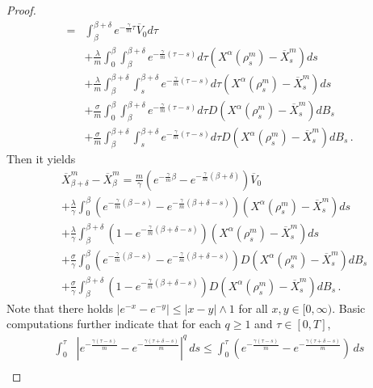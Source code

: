 \documentclass{ims9x6}
\newcommand{\nn}{\nonumber}
\newcommand{\OV}{\overline{V}}
\newcommand{\OX}{\overline{X}}
\begin{document}
\begin{proof}
\begin{equation*}
	\end{equation*}
	\begin{equation*}
		\begin{split}
		=&\int_\beta^{\beta+\delta}  e^{-\frac{\gamma}{m}\tau}\OV_0d\tau\\
		&+\frac{\lambda}{m}\int_0^\beta\int_\beta^{\beta+\delta} e^{-\frac{\gamma}{m}(\tau-s)}d\tau (X^{\alpha}(\rho_s^m)-\OX_s^m)ds\\
		&+\frac{\lambda}{m}\int_\beta^{\beta+\delta}\int_s^{\beta+\delta} e^{-\frac{\gamma}{m}(\tau-s)}d\tau (X^{\alpha}(\rho_s^m)-\OX_s^m)ds\\
		& +\frac{\sigma}{m}\int_0^\beta\int_\beta^{\beta+\delta} e^{-\frac{\gamma}{m}(\tau-s)}d\tau D(X^{\alpha}(\rho_s^m)-\OX_s^m)dB_s \\
		&+\frac{\sigma}{m}\int_\beta^{\beta+\delta}\int_s^{\beta+\delta} e^{-\frac{\gamma}{m}(\tau-s)}d\tau D(X^{\alpha}(\rho_s^m)-\OX_s^m)dB_s \,.
		\end{split}
	\end{equation*}
	Then it yields
	\begin{equation}\label{diff}
	\begin{split}
		& \OX_{\beta+\delta}^m-\OX_{\beta}^m	=\frac{m}{\gamma}(e^{-\frac{\gamma}{m}\beta}-e^{-\frac{\gamma}{m}(\beta+\delta)})\OV_0 \\
		&+\frac{\lambda}{\gamma}\int_0^\beta (e^{-\frac{\gamma}{m}(\beta-s)}-e^{-\frac{\gamma}{m}(\beta+\delta-s)}) (X^{\alpha}(\rho_s^m)-\OX_s^m)ds\\
		&+\frac{\lambda}{\gamma}\int_\beta^{\beta+\delta} (1-e^{-\frac{\gamma}{m}(\beta+\delta-s)}) (X^{\alpha}(\rho_s^m)-\OX_s^m)ds\\
		&+\frac{\sigma}{\gamma}\int_0^\beta (e^{-\frac{\gamma}{m}(\beta-s)}-e^{-\frac{\gamma}{m}(\beta+\delta-s)})D(X^{\alpha}(\rho_s^m)-\OX_s^m)dB_s\\
		&+\frac{\sigma}{\gamma}\int_\beta^{\beta+\delta} (1-e^{-\frac{\gamma}{m}(\beta+\delta-s)})D(X^{\alpha}(\rho_s^m)-\OX_s^m)dB_s\,.
		\end{split}
		\end{equation}	
	Note that there holds $|e^{-x}-e^{-y}|\leq |x-y|\wedge 1 $ for all $x,y\in[0,\infty)$. Basic computations further indicate that for each $q\geq 1$ and $\tau\in[0,T]$,
	\begin{align*}
	\int_0^{\tau} &
	\left| e^{-\frac{\gamma(\tau-s)}{m}} - e^{-\frac{\gamma(\tau+\delta-s)}{m}}   \right|^q \,ds
	\leq
	\int_0^{\tau}
	\left( e^{-\frac{\gamma(\tau-s)}{m}} - e^{-\frac{\gamma(\tau+\delta-s)}{m}}  \right) \,ds\nn\\

\end{align*}
\end{proof}
\end{document}
